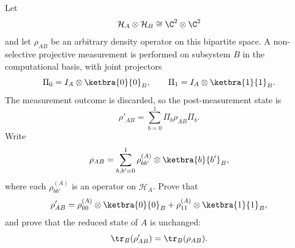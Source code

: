 Let
$$
    \mathcal H_A\otimes\mathcal H_B\cong \C^2\otimes\C^2
$$
and let $\rho_{AB}$ be an arbitrary density operator on this bipartite space.  A non-selective projective measurement is performed on subsystem $B$ in the computational basis, with joint projectors
$$
    \Pi_0=I_A\otimes\ketbra{0}{0}_B,
    \qquad
    \Pi_1=I_A\otimes\ketbra{1}{1}_B.
$$
The measurement outcome is discarded, so the post-measurement state is
$$
    \rho'_{AB}=\sum_{b=0}^1\Pi_b\rho_{AB}\Pi_b .
$$
Write
$$
    \rho_{AB}=
    \sum_{b,b'=0}^1\rho_{bb'}^{(A)}\otimes\ketbra{b}{b'}_B,
$$
where each $\rho_{bb'}^{(A)}$ is an operator on $\mathcal H_A$.  Prove that
$$
    \rho'_{AB}=
    \rho_{00}^{(A)}\otimes\ketbra{0}{0}_B
    +
    \rho_{11}^{(A)}\otimes\ketbra{1}{1}_B,
$$
and prove that the reduced state of $A$ is unchanged:
$$
    \tr_B(\rho'_{AB})=\tr_B(\rho_{AB}).
$$
